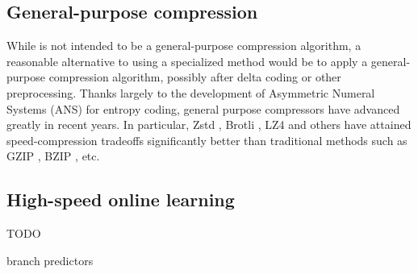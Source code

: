 \subsection{General-purpose compression}
While \mine is not intended to be a general-purpose compression algorithm, a reasonable alternative to using a specialized method would be to apply a general-purpose compression algorithm, possibly after delta coding or other preprocessing. Thanks largely to the development of Asymmetric Numeral Systems (ANS) \cite{ans} for entropy coding, general purpose compressors have advanced greatly in recent years. In particular, Zstd \cite{zstd}, Brotli \cite{brotli}, LZ4 \cite{lz4} and others have attained speed-compression tradeoffs significantly better than traditional methods such as GZIP \cite{gzip}, BZIP \cite{lzo}, etc.

\subsection{High-speed online learning}

TODO

branch predictors
